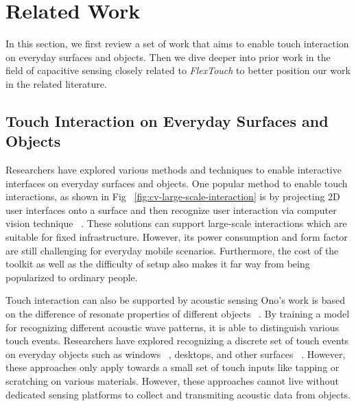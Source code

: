\chapter{Related Work}
In this section, we first review a set of work that aims to enable touch interaction on everyday surfaces and objects. Then we dive deeper into prior work in the field of capacitive sensing closely related to \textit{FlexTouch} to better position our work in the related literature.

\section{Touch Interaction on Everyday Surfaces and Objects}
Researchers have explored various methods and techniques to enable interactive interfaces on everyday surfaces and objects. One popular method to enable touch interactions, as shown in Fig ~\ref{fig:cv-large-scale-interaction} is by projecting 2D user interfaces onto a surface and then recognize user interaction via computer vision technique ~\cite{pinhanez2001everywhere, Fails-2002-Light-Widgets, Wilson-2010-Light-Space, Xiao-WorldKit}. These solutions can support large-scale interactions which are suitable for fixed infrastructure. However, its power consumption and form factor are still challenging for everyday mobile scenarios.  Furthermore, the cost of the toolkit as well as the difficulty of setup also makes it far way from being popularized to ordinary people. 


Touch interaction can also be supported by acoustic sensing Ono's work is based on the difference of resonate properties of different objects ~\cite{Ono-Touch-and-Activate}. By training a model for recognizing different acoustic wave patterns, it is able to distinguish various touch events. Researchers have explored recognizing a discrete set of touch events on everyday objects such as windows ~\cite{Paradiso-2002-Window}, desktops, and other surfaces ~\cite{Harrison-2008-Scratch-iput}. However, these approaches only apply towards a small set of touch inputs like tapping or scratching on various materials. However, these approaches cannot live without dedicated sensing platforms to collect and transmiting acoustic data from objects. 


